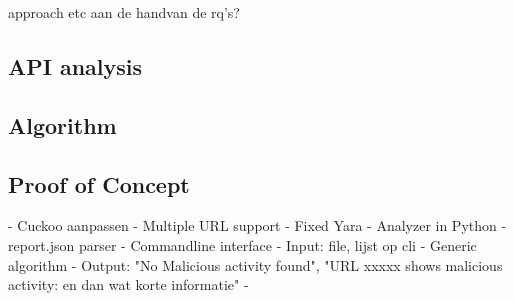 approach etc aan de handvan de rq's?

\subsection{API analysis}

\subsection{Algorithm}

\subsection{Proof of Concept}
	- Cuckoo aanpassen
		- Multiple URL support
		- Fixed Yara
	- Analyzer in Python
		- report.json parser
		- Commandline interface
			- Input: file, lijst op cli
			- Generic algorithm
			- Output: "No Malicious activity found", "URL xxxxx shows malicious activity: en dan wat korte informatie" 
		- 